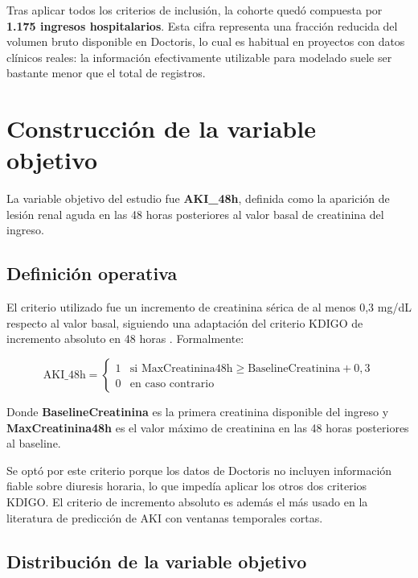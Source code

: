 \documentclass[12pt, a4paper, oneside]{report}
\begin{document}
Tras aplicar todos los criterios de inclusión, la cohorte quedó compuesta por \textbf{1.175 ingresos hospitalarios}. Esta cifra representa una fracción reducida del volumen bruto disponible en Doctoris, lo cual es habitual en proyectos con datos clínicos reales: la información efectivamente utilizable para modelado suele ser bastante menor que el total de registros.

\section{Construcción de la variable objetivo}

La variable objetivo del estudio fue \textbf{AKI\_48h}, definida como la aparición de lesión renal aguda en las 48 horas posteriores al valor basal de creatinina del ingreso.

\subsection{Definición operativa}

El criterio utilizado fue un incremento de creatinina sérica de al menos 0,3 mg/dL respecto al valor basal, siguiendo una adaptación del criterio KDIGO de incremento absoluto en 48 horas \parencite{kdigo2012aki}. Formalmente:

\begin{equation}
\text{AKI\_48h} =
\begin{cases}
1 & \text{si } \text{MaxCreatinina48h} \geq \text{BaselineCreatinina} + 0{,}3 \\
0 & \text{en caso contrario}
\end{cases}
\end{equation}

Donde \textbf{BaselineCreatinina} es la primera creatinina disponible del ingreso y \textbf{MaxCreatinina48h} es el valor máximo de creatinina en las 48 horas posteriores al baseline.

Se optó por este criterio porque los datos de Doctoris no incluyen información fiable sobre diuresis horaria, lo que impedía aplicar los otros dos criterios KDIGO. El criterio de incremento absoluto es además el más usado en la literatura de predicción de AKI con ventanas temporales cortas.

\subsection{Distribución de la variable objetivo}
\end{document}
